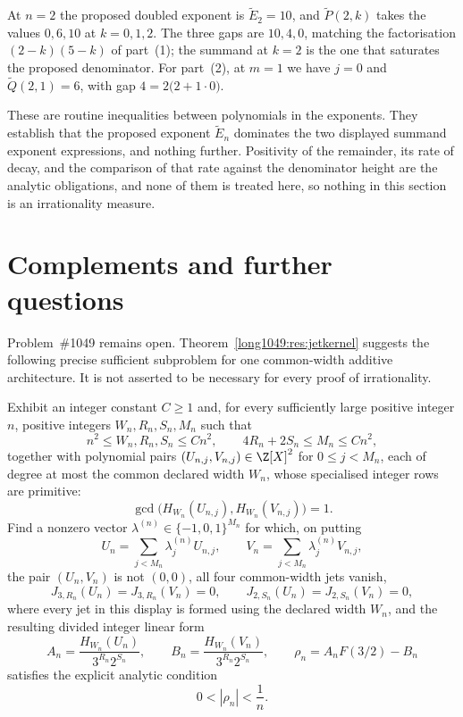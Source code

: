 \begin{example}\label{long1049:ex:pade}
At $n=2$ the proposed doubled exponent is $\widetilde{E}_2=10$, and
$\widetilde{P}(2,k)$ takes the values $0,6,10$ at $k=0,1,2$.  The three gaps are
$10,4,0$, matching the factorisation $(2-k)(5-k)$ of part~(1); the summand at
$k=2$ is the one that saturates the proposed denominator.  For part~(2), at
$m=1$ we have $j=0$ and $\widetilde{Q}(2,1)=6$, with gap
$4=2\bigl(2+1\cdot0\bigr)$.
\end{example}

These are routine inequalities between polynomials in the exponents.  They
establish that the proposed exponent $\widetilde{E}_n$ dominates the two
displayed summand exponent expressions, and nothing further.  Positivity of the remainder, its rate of
decay, and the comparison of that rate against the denominator height are the
analytic obligations, and none of them is treated here, so nothing in this
section is an irrationality measure.

\section{Complements and further questions}\label{long1049:sec:open}

Problem~\#1049 remains open.  Theorem~\ref{long1049:res:jetkernel} suggests the following precise sufficient
subproblem for one common-width additive architecture.  It is not asserted to
be necessary for every proof of irrationality.

\begin{problem}\label{long1049:prob:kernel}
Exhibit an integer constant \(C\ge1\) and, for every sufficiently large
positive integer \(n\), positive integers \(W_n,R_n,S_n,M_n\) such that
\[
 n^2\le W_n,R_n,S_n\le Cn^2,
 \qquad 4R_n+2S_n\le M_n\le Cn^2,
\]
together with polynomial pairs
\((U_{n,j},V_{n,j})\in\Z[X]^2\) for \(0\le j<M_n\), each of degree at most
the common declared width \(W_n\), whose specialised integer rows are
primitive:
\[
 \gcd\!\bigl(H_{W_n}(U_{n,j}),H_{W_n}(V_{n,j})\bigr)=1.
\]
Find a nonzero vector
\(\lambda^{(n)}\in\{-1,0,1\}^{M_n}\) for which, on putting
\[
 U_n=\sum_{j<M_n}\lambda^{(n)}_jU_{n,j},
 \qquad V_n=\sum_{j<M_n}\lambda^{(n)}_jV_{n,j},
\]
the pair \((U_n,V_n)\) is not \((0,0)\), all four common-width jets vanish,
\[
 J_{3,R_n}(U_n)=J_{3,R_n}(V_n)=0,
 \qquad J_{2,S_n}(U_n)=J_{2,S_n}(V_n)=0,
\]
where every jet in this display is formed using the declared width \(W_n\),
and the resulting divided integer linear form
\[
 A_n=\frac{H_{W_n}(U_n)}{3^{R_n}2^{S_n}},
 \qquad
 B_n=\frac{H_{W_n}(V_n)}{3^{R_n}2^{S_n}},
 \qquad
 \rho_n=A_nF(3/2)-B_n
\]
satisfies the explicit analytic condition
\[
 0<|\rho_n|<\frac1n.
\]
\end{problem}

